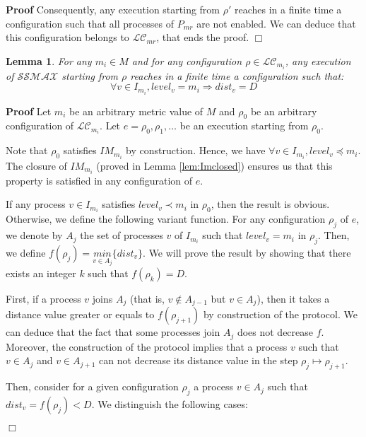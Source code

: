 \documentclass[11pt]{article}
\newenvironment{proof}{\noindent\textbf{Proof}}{\hfill\qed}
\newcommand{\qed}{\hfill$\Box$}
\newtheorem{lem}{Lemma}
\newenvironment{lemma}[1]{\vspace{-0.25cm}\begin{lem}#1}{\end{lem}\vspace{-0.3cm}}
\begin{document}
\begin{proof}
Consequently, any execution starting from $\rho'$ reaches in a finite time a configuration such that all processes of $P_{mr}$ are not enabled. We can deduce that this configuration belongs to $\mathcal{LC}_{mr}$, that ends the proof.
\end{proof}

\begin{lemma}\label{lem:LCmitodistD}
For any $m_i\in M$ and for any configuration $\rho\in \mathcal{LC}_{m_i}$, any execution of $\mathcal{SSMAX}$ starting from $\rho$ reaches in a finite time a configuration such that:
\[\forall v\in I_{m_i},level_v=m_i\Rightarrow dist_v=D\]
\end{lemma}

\begin{proof}
Let $m_i$ be an arbitrary metric value of $M$ and $\rho_0$ be an arbitrary configuration of $\mathcal{LC}_{m_i}$. Let $e=\rho_0,\rho_1,\ldots$ be an execution starting from $\rho_0$.

Note that $\rho_0$ satisfies $IM_{m_i}$ by construction. Hence, we have $\forall v\in I_{m_i},level_v\preceq m_i$. The closure  of $IM_{m_i}$ (proved in Lemma \ref{lem:Imclosed}) ensures us that this property is satisfied in any configuration of $e$. 

If any process $v\in I_{m_i}$ satisfies $level_v\prec m_i$ in $\rho_0$, then the result is obvious. Otherwise, we define the following variant function. For any configuration $\rho_j$ of $e$, we denote by $A_j$ the set of processes $v$ of $I_{m_i}$ such that $level_v=m_i$ in $\rho_j$. Then, we define $f(\rho_j)=\underset{v\in A_j}{min}\{dist_v\}$. We will prove the result by showing that there exists an integer $k$ such that $f(\rho_k)=D$.

First, if a process $v$ joins $A_j$ (that is, $v\notin A_{j-1}$ but $v\in A_j$), then it takes a distance value greater or equals to $f(\rho_{j+1})$ by construction of the protocol. We can deduce that the fact that some processes join $A_j$ does not decrease $f$. Moreover, the construction of the protocol implies that a process $v$ such that $v\in A_j$ and $v\in A_{j+1}$ can not decrease its distance value in the step $\rho_j\mapsto \rho_{j+1}$.

Then, consider for a given configuration $\rho_j$ a process $v\in A_j$ such that $dist_v=f(\rho_j)<D$. We distinguish the following cases:


\end{proof}
\end{document}
